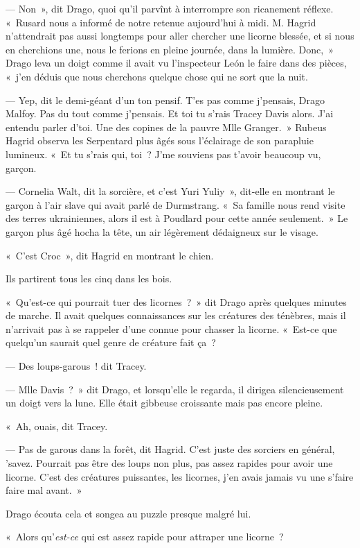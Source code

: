 --- Non~», dit Drago, quoi qu'il parvînt à interrompre son ricanement réflexe.
«~Rusard nous a informé de notre retenue aujourd'hui à midi.
M. Hagrid n'attendrait pas aussi longtemps pour aller chercher une licorne blessée, et si nous en cherchions une, nous le ferions en pleine journée, dans la lumière.
Donc,~» Drago leva un doigt comme il avait vu l'inspecteur León le faire dans des pièces, «~j'en déduis que nous cherchons quelque chose qui ne sort que la nuit.

--- Yep, dit le demi-géant d'un ton pensif.
T'es pas comme j'pensais, Drago Malfoy.
Pas du tout comme j'pensais.
Et toi tu s'rais Tracey Davis alors.
J'ai entendu parler d'toi.
Une des copines de la pauvre Mlle Granger.~»
Rubeus Hagrid observa les Serpentard plus âgés sous l'éclairage de son parapluie lumineux.
«~Et tu s'rais qui, toi~?
J'me souviens pas t'avoir beaucoup vu, garçon.

--- Cornelia Walt, dit la sorcière, et c'est Yuri Yuliy~», dit-elle en montrant le garçon à l'air slave qui avait parlé de Durmstrang.
«~Sa famille nous rend visite des terres ukrainiennes, alors il est à Poudlard pour cette année seulement.~»
Le garçon plus âgé hocha la tête, un air légèrement dédaigneux sur le visage.

«~C'est Croc~», dit Hagrid en montrant le chien.

Ils partirent tous les cinq dans les bois.

«~Qu'est-ce qui pourrait tuer des licornes~?~»
dit Drago après quelques minutes de marche.
Il avait quelques connaissances sur les créatures des ténèbres, mais il n'arrivait pas à se rappeler d'une connue pour chasser la licorne.
«~Est-ce que quelqu'un saurait quel genre de créature fait ça~?

--- Des loups-garous~! dit Tracey.

--- Mlle Davis~?~»
dit Drago, et lorsqu'elle le regarda, il dirigea silencieusement un doigt vers la lune.
Elle était gibbeuse croissante mais pas encore pleine.

«~Ah, ouais, dit Tracey.

--- Pas de garous dans la forêt, dit Hagrid.
C'est juste des sorciers en général, 'savez.
Pourrait pas être des loups non plus, pas assez rapides pour avoir une licorne.
C'est des créatures puissantes, les licornes, j'en avais jamais vu une s'faire faire mal avant.~»

Drago écouta cela et songea au puzzle presque malgré lui.

«~Alors qu'\emph{est-ce} qui est assez rapide pour attraper une licorne~?

